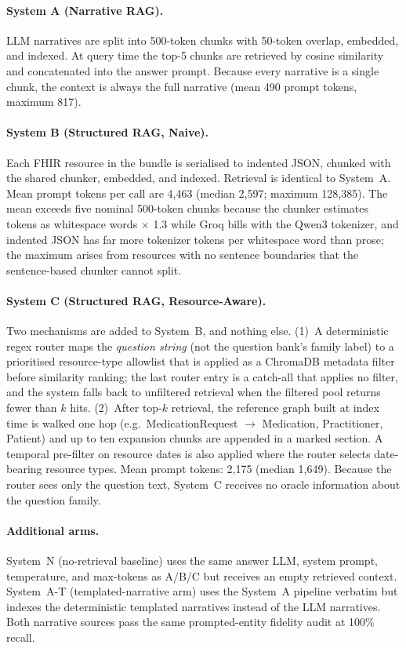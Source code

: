\paragraph{System A (Narrative RAG).}
LLM narratives are split into 500-token chunks with 50-token overlap, embedded, and indexed.
At query time the top-5 chunks are retrieved by cosine similarity and concatenated into the
answer prompt.  Because every narrative is a single chunk, the context is always the
full narrative (mean 490 prompt tokens, maximum 817).

\paragraph{System B (Structured RAG, Naive).}
Each FHIR resource in the bundle is serialised to indented JSON, chunked with the shared
chunker, embedded, and indexed.  Retrieval is identical to System~A.  Mean prompt
tokens per call are 4,463 (median 2,597; maximum 128,385).  The mean exceeds five nominal
500-token chunks because the chunker estimates tokens as whitespace words $\times$ 1.3
while Groq bills with the Qwen3 tokenizer, and indented JSON has far more tokenizer tokens
per whitespace word than prose; the maximum arises from resources with no sentence
boundaries that the sentence-based chunker cannot split.

\paragraph{System C (Structured RAG, Resource-Aware).}
Two mechanisms are added to System~B, and nothing else.  (1)~A deterministic regex router
maps the \emph{question string} (not the question bank's family label) to a prioritised
resource-type allowlist that is applied as a ChromaDB metadata filter before similarity
ranking; the last router entry is a catch-all that applies no filter, and the system
falls back to unfiltered retrieval when the filtered pool returns fewer than $k$ hits.
(2)~After top-$k$ retrieval, the reference graph built at index time is walked one hop
(e.g.\ MedicationRequest $\rightarrow$ Medication, Practitioner, Patient) and up to ten
expansion chunks are appended in a marked section.  A temporal pre-filter on resource
dates is also applied where the router selects date-bearing resource types.  Mean prompt
tokens: 2,175 (median 1,649).  Because the router sees only the question text, System~C
receives no oracle information about the question family.

\paragraph{Additional arms.}
System~N (no-retrieval baseline) uses the same answer LLM, system prompt, temperature,
and max-tokens as A/B/C but receives an empty retrieved context.  System~A-T
(templated-narrative arm) uses the System~A pipeline verbatim but indexes the
deterministic templated narratives instead of the LLM narratives.  Both narrative sources
pass the same prompted-entity fidelity audit at 100\% recall.

